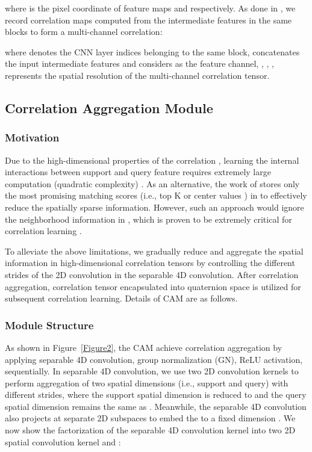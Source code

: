 \documentclass[lettersize,journal]{IEEEtran}
\begin{document}
where  is the pixel coordinate of feature maps  and  respectively. As done in \cite{RN18}, we record correlation maps computed from the intermediate features in the same blocks to form a multi-channel correlation: 

where  denotes the CNN layer indices belonging to the same block,  concatenates the input intermediate features and considers  as the feature channel, , , ,  represents the spatial resolution of the multi-channel correlation tensor. 

\subsection{Correlation Aggregation Module}\label{4.4}
\subsubsection{Motivation}
Due to the high-dimensional properties of the correlation ,  learning the internal interactions between support and query feature requires extremely large computation (quadratic complexity) . As an alternative, the work of \cite{RN42, RN85} stores only the most promising matching scores (i.e.,  top K or center values ) in  to effectively reduce the spatially sparse information. However, such an approach would ignore the neighborhood information in , which is proven to be extremely critical for correlation learning \cite{RN19}. 

To alleviate the above limitations, we gradually reduce and aggregate the spatial information in high-dimensional correlation tensors  by controlling the different strides of the 2D convolution in the separable 4D convolution. After correlation aggregation, correlation tensor encapsulated into quaternion space is utilized for subsequent correlation learning. Details of CAM are as follows.

\subsubsection{Module Structure}
As shown in Figure~\ref{Figure2}, the CAM achieve correlation aggregation by applying separable 4D convolution, group normalization (GN)\cite{RN69}, ReLU activation, sequentially. In separable 4D convolution, we use two 2D convolution kernels to perform aggregation of two spatial dimensions (i.e., support and query) with different strides, where the support spatial dimension is reduced to  and the query spatial dimension remains the same as . Meanwhile, the separable 4D convolution also projects  at separate 2D subspaces to embed the  to a fixed dimension . We now show the factorization of the separable 4D convolution kernel  into two 2D spatial convolution kernel  and  :
\end{document}
